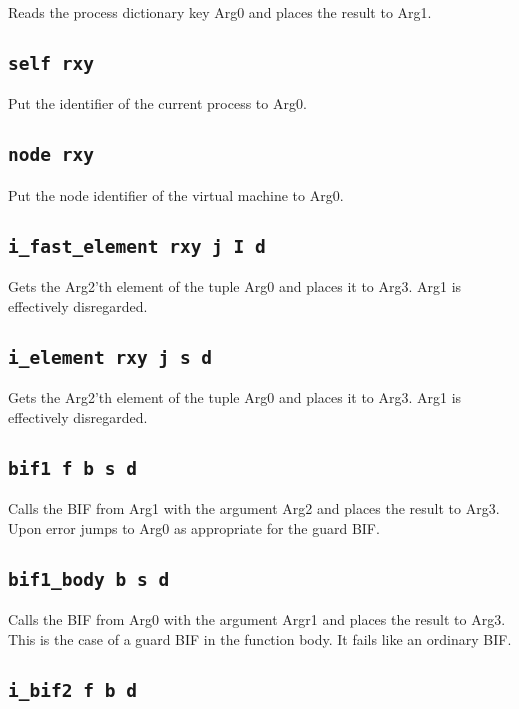 \documentclass{article}
\newcommand{\iop}[1]{\texttt{#1}}
\begin{document}
Reads the process dictionary key Arg0 and places the result to Arg1.

\subsection*{\iop{self rxy}}

Put the identifier of the current process to Arg0.

\subsection*{\iop{node rxy}}

Put the node identifier of the virtual machine to Arg0.

\subsection*{\iop{i\_fast\_element rxy j I d}}

Gets the Arg2'th element of the tuple Arg0 and places it to Arg3. Arg1 is
effectively disregarded.

\subsection*{\iop{i\_element rxy j s d}}

Gets the Arg2'th element of the tuple Arg0 and places it to Arg3. Arg1 is
effectively disregarded.

\subsection*{\iop{bif1 f b s d}}

Calls the BIF from Arg1 with the argument Arg2 and places the result to Arg3.
Upon error jumps to Arg0 as appropriate for the guard BIF.

\subsection*{\iop{bif1\_body b s d}}

Calls the BIF from Arg0 with the argument Argr1 and places the result to Arg3.
This is the case of a guard BIF in the function body. It fails like an ordinary
BIF.

\subsection*{\iop{i\_bif2 f b d}}
\end{document}
